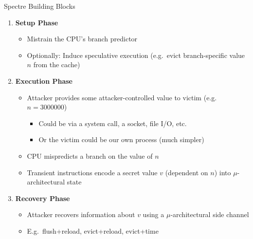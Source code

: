 \documentclass[10pt, dvipsnames, aspectratio=169]{beamer}
\begin{document}
\begin{frame}[c]{Spectre Building Blocks}
  \begin{enumerate}
    \item {\bf\color{blue}Setup Phase}
    \begin{itemize}
      \item Mistrain the CPU's branch predictor
      \item Optionally: Induce speculative execution (e.g.~evict branch-specific value $n$ from the cache)
    \end{itemize}

    \vfill
    \item {\bf\color{orange}Execution Phase}
    \begin{itemize}
      \item Attacker provides some attacker-controlled value to victim (e.g.~$n = 3000000$)
      \begin{itemize}
        \item Could be via a system call, a socket, file I/O, etc.
        \item Or the victim could be our own process (much simpler)
      \end{itemize}
      \item CPU mispredicts a branch on the value of $n$
      \item Transient instructions encode a secret value $v$ (dependent on $n$) into $\mu$-architectural state
    \end{itemize}

    \vfill
    \item {\bf\color{green}Recovery Phase}
    \begin{itemize}
      \item Attacker recovers information about $v$ using a $\mu$-architectural side channel
      \item E.g.~flush+reload, evict+reload, evict+time
    \end{itemize}
  \end{enumerate}
\end{frame}
\end{document}

